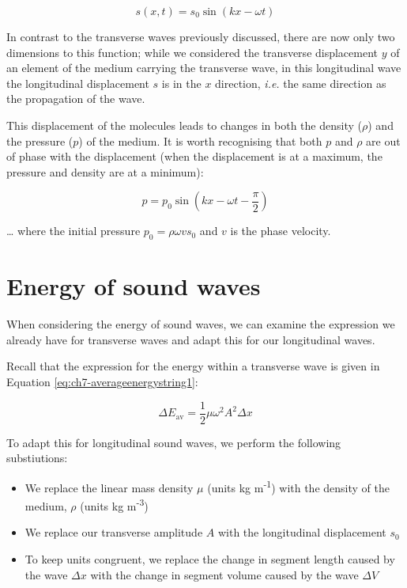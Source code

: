 \documentclass[
]{book}
\providecommand{\tightlist}{%
  \setlength{\itemsep}{0pt}\setlength{\parskip}{0pt}}
\begin{document}
\begin{equation}
s(x,t) = s_0 \sin (kx - \omega t)
\label{eq:ch9-soundwaveeq1}
\end{equation}

In contrast to the transverse waves previously discussed, there are now only two dimensions to this function; while we considered the transverse displacement \(y\) of an element of the medium carrying the transverse wave, in this longitudinal wave the longitudinal displacement \(s\) is in the \(x\) direction, \emph{i.e.} the same direction as the propagation of the wave.

This displacement of the molecules leads to changes in both the density (\(\rho\)) and the pressure (\(p\)) of the medium. It is worth recognising that both \(p\) and \(\rho\) are out of phase with the displacement (when the displacement is at a maximum, the pressure and density are at a minimum):

\begin{equation}
p = p_0 \sin (kx - \omega t - \frac{\pi}{2})
\label{eq:ch9-soundwaveeq2}
\end{equation}

\ldots{} where the initial pressure \(p_0 = \rho \omega v s_0\) and \(v\) is the phase velocity.

\hypertarget{sec:ch9-energysoundwaves}{%
\section{Energy of sound waves}\label{sec:ch9-energysoundwaves}}

When considering the energy of sound waves, we can examine the expression we already have for transverse waves and adapt this for our longitudinal waves.

Recall that the expression for the energy within a transverse wave is given in Equation \eqref{eq:ch7-averageenergystring1}:

\begin{equation}
\Delta E_{\mathrm{av}} = \frac{1}{2}\mu \omega^2 A^2 \Delta x
\end{equation}

To adapt this for longitudinal sound waves, we perform the following substiutions:

\begin{itemize}
\tightlist
\item
  We replace the linear mass density \(\mu\) (units kg m\textsuperscript{-1}) with the density of the medium, \(\rho\) (units kg m\textsuperscript{-3})
\item
  We replace our transverse amplitude \(A\) with the longitudinal displacement \(s_0\)
\item
  To keep units congruent, we replace the change in segment length caused by the wave \(\Delta x\) with the change in segment volume caused by the wave \(\Delta V\)
\end{itemize}
\end{document}

